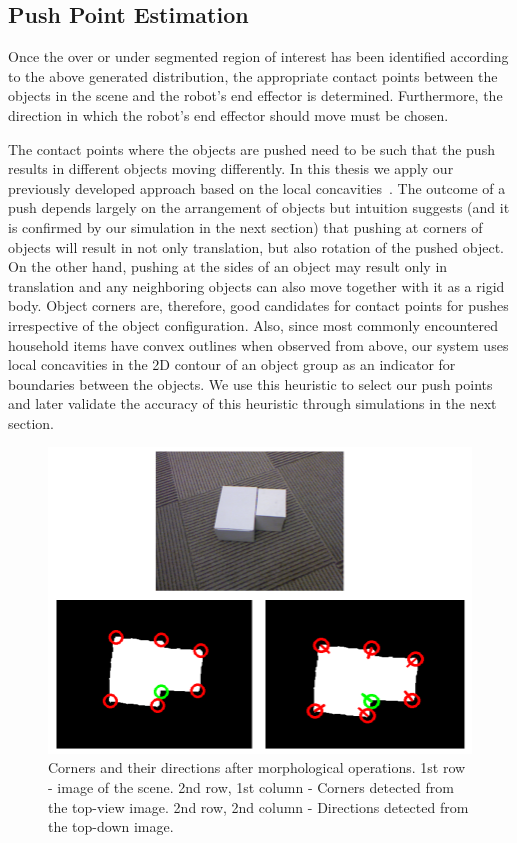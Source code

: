 \subsection{Push Point Estimation}
\label{sec:push-point}
Once the over or under segmented region of interest has been identified 
according to the above generated distribution, the  appropriate contact
points  between the objects in   the   scene  and   the   robot's   end   
effector is determined. Furthermore, the  direction in which  the robot's  end
effector should move must be chosen.

The contact points where the objects are pushed need to
be such that the push results in different objects moving
differently.
In  this thesis we apply our previously developed approach based on 
the local concavities~\cite{bersch12interactive}. The outcome
of a push depends largely on the arrangement of objects but
intuition suggests (and it is confirmed by our simulation in the next section) that pushing at corners of objects will
result in not only translation, but also rotation of the pushed object. On the other hand, pushing at the
sides of an object may result only in translation and any
neighboring objects can also move together with it as a
rigid body. Object corners are, therefore, good candidates for
contact points for pushes irrespective of the object configuration. Also, since most
commonly  encountered  household   items  have  convex  outlines  when
observed  from  above,  our  system  uses  local
concavities in the  2D contour of an object group  as an indicator for
boundaries between the objects.
We use this heuristic to select our push points and later
validate the accuracy of this heuristic through simulations in
the next section.

\begin{figure}[tb!]
   \begin{center}
     \includegraphics[width=.9\columnwidth]{figures/corners.png}
		\vspace{-2ex}
   \caption{Corners and their directions after morphological operations. 1st row - image of the scene. 2nd row, 1st column - Corners detected from the top-view image. 2nd row, 2nd column - Directions detected from the top-down image. }
   \label{fig:corners}
 \end{center}
 \end{figure}

